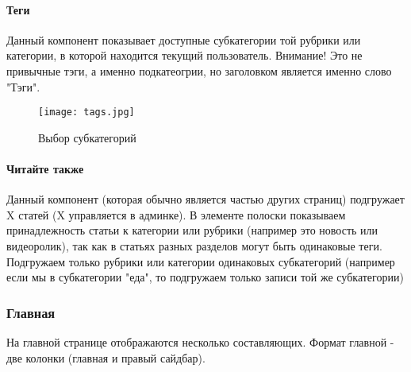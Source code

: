 \documentclass[DIV=calc, paper=a4, fontsize=11pt]{scrartcl} %
\begin{document}
\paragraph{Теги}
Данный компонент показывает доступные субкатегории той рубрики или категории, в которой находится текущий пользователь. Внимание! Это не привычные тэги, а именно подкатеогрии, но заголовком является именно слово "Тэги".
            \begin{figure}[ht!]
            \centering
            \texttt{[image: tags.jpg]}
            \caption{Выбор субкатегорий \label{fig:tags.jpg}}
            \end{figure}

\paragraph{Читайте также}
Данный компонент (которая обычно является частью других страниц) подгружает X статей (X управляется в админке). В элементе полоски показываем принадлежность статьи к категории или рубрики (например это новость или видеоролик), так как в статьях разных разделов могут быть одинаковые теги. Подгружаем только рубрики или категории одинаковых субкатегорий (например если мы в субкатегории "еда", то подгружаем только записи той же субкатегории)

\subsubsection{Главная} \label{main}
На главной странице отображаются несколько составляющих. Формат главной - две колонки (главная и правый сайдбар).
\end{document}
